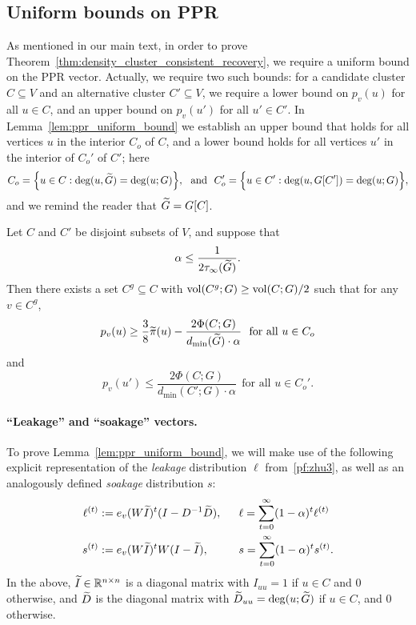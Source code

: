 \subsection{Uniform bounds on PPR}
\label{subsec:ppr_uniform_bounds}
As mentioned in our main text, in order to prove Theorem~\ref{thm:density_cluster_consistent_recovery}, we require a uniform bound on the PPR vector. Actually, we require two such bounds: for a candidate cluster $C \subseteq V$ and an alternative cluster $C' \subseteq V$, we require a lower bound on $p_v(u)$ for all $u \in C$, and an upper bound on $p_v(u')$ for all $u' \in C'$. In Lemma~\ref{lem:ppr_uniform_bound} we establish an upper bound that holds for all vertices $u$ in the interior $C_{o}$ of $C$, and a lower bound holds for all vertices $u'$ in the interior of $C_{o}'$ of $C'$; here
\begin{equation*}
C_{o} = \Bigl\{u \in C: \deg(u,\widetilde{G}) =  \deg(u;G)\Bigr\},~~\textrm{and}~~C_{o}'= \Bigl\{u \in C': \deg(u,G[C']) =  \deg(u;G)\Bigr\},
\end{equation*}
and we remind the reader that $\widetilde{G} = G[C]$. 
\begin{lemma}
	\label{lem:ppr_uniform_bound}
	Let $C$ and $C'$ be disjoint subsets of $V$, and suppose that
	\begin{equation*}
	\alpha \leq \frac{1}{2\tau_{\infty}(\widetilde{G})}.
	\end{equation*}
	Then there exists a set $C^g \subseteq C$ with $\mathrm{vol}(C^g;G) \geq \mathrm{vol}(C;G)/2$ such that for any $v \in C^g$,
	\begin{equation}
	\label{eqn:ppr_uniform_bound_C}
	p_v(u) \geq \frac{3}{8}\widetilde{\pi}(u) - \frac{2 \Phi(C;G)}{d_{\min}(\widetilde{G})\cdot \alpha}~~\textrm{for all $u \in C_{o}$}
	\end{equation}
	and
	\begin{equation}
	\label{eqn:ppr_uniform_bound_Cprime}
	p_v(u') \leq \frac{2\Phi(C;G)}{d_{\min}(C';G) \cdot \alpha}~~\textrm{for all $u \in C_{o}'$.}
	\end{equation}
\end{lemma}

\paragraph{``Leakage'' and ``soakage'' vectors.} To prove Lemma~\ref{lem:ppr_uniform_bound}, we will make use of the following explicit representation of the \emph{leakage} distribution $\ell$ from~\eqref{pf:zhu3}, as well as an analogously defined \emph{soakage} distribution $s$:
\begin{equation}
\label{eqn:leakage_soakage}
\begin{aligned}
\ell^{(t)} & := e_v(W \widetilde{I})^t(I - D^{-1}\widetilde{D}),~~&& \ell = \sum_{t = 0}^{\infty} (1 - \alpha)^t \ell^{(t)} \\
s^{(t)} & := e_v(W \widetilde{I})^t W (I - \widetilde{I}),~~&& s = \sum_{t = 0}^{\infty} (1 - \alpha)^t s^{(t)}.
\end{aligned}
\end{equation}
In the above, $\widetilde{I} \in \mathbb{R}^{n \times n}$ is a diagonal matrix with $I_{uu} = 1$ if $u \in C$ and $0$ otherwise, and $\widetilde{D}$ is the diagonal matrix with $\widetilde{D}_{uu} = \deg(u;\widetilde{G})$ if $u \in C$, and $0$ otherwise. 

